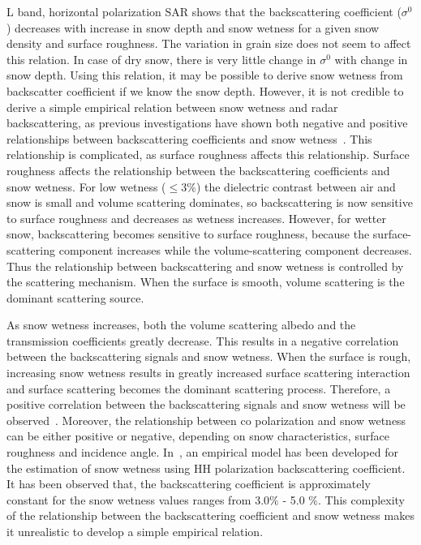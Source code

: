 \begin{description}
	L band, horizontal polarization SAR shows that the backscattering coefficient ($\sigma^0$) decreases with increase in snow depth and snow wetness for a given snow density and surface roughness.  The variation in grain size does not seem to affect this relation.  In case of dry snow, there is very little change in $\sigma^0$ with change in snow depth.  Using this relation, it may be possible to derive snow wetness from backscatter coefficient if we know the snow depth.  However, it is not credible to derive a simple empirical relation between snow wetness and radar backscattering, as previous investigations have shown both negative and positive relationships between backscattering coefficients and snow wetness~\citep{Shi95wetness}. This relationship is complicated, as surface roughness affects this relationship. Surface roughness affects the relationship between the backscattering coefficients and snow wetness.  For low wetness ($\le 3\%$) the dielectric contrast between air and snow is small and volume scattering dominates, so backscattering is now sensitive to surface roughness and decreases as wetness increases.  However, for wetter snow, backscattering becomes sensitive to surface roughness, because the surface-scattering component increases while the volume-scattering component decreases. Thus the relationship between backscattering and snow wetness is controlled by the scattering mechanism.  When the surface is smooth, volume scattering is the dominant scattering source. 
	
    As snow wetness increases, both the volume scattering albedo and the transmission coefficients greatly decrease.  This results in a negative correlation between the backscattering signals and snow wetness.  When the surface is rough, increasing snow wetness results in greatly increased surface scattering interaction and surface scattering becomes the dominant scattering process.  Therefore, a positive correlation between the backscattering signals and snow wetness will be observed~\citep{Shi93}. Moreover, the relationship between co polarization and snow wetness can be either positive or negative, depending on snow characteristics, surface roughness and incidence angle. In~\citep{Singh2007_spie}, an empirical model has been developed for the estimation of snow wetness using $\mbox{HH}$ polarization backscattering coefficient. It has been observed that, the backscattering coefficient is approximately constant for the snow wetness values ranges from 3.0$\%$ - 5.0 $\%$.  This complexity of the relationship between the backscattering coefficient and snow wetness makes it unrealistic to develop a simple empirical relation. 
		

\end{description}
